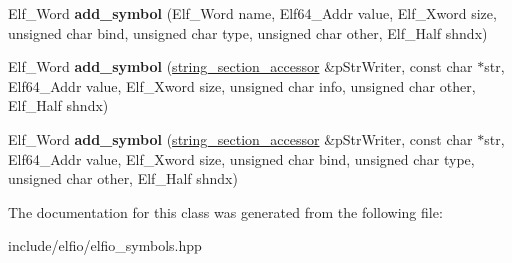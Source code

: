\begin{DoxyCompactItemize}
\item 
Elf\+\_\+\+Word {\bfseries add\+\_\+symbol} (Elf\+\_\+\+Word name, Elf64\+\_\+\+Addr value, Elf\+\_\+\+Xword size, unsigned char bind, unsigned char type, unsigned char other, Elf\+\_\+\+Half shndx)\hypertarget{class_e_l_f_i_o_1_1symbol__section__accessor_a0b20886a5e1dcb93534e813517d99f5b}{}\label{class_e_l_f_i_o_1_1symbol__section__accessor_a0b20886a5e1dcb93534e813517d99f5b}

\item 
Elf\+\_\+\+Word {\bfseries add\+\_\+symbol} (\hyperlink{class_e_l_f_i_o_1_1string__section__accessor}{string\+\_\+section\+\_\+accessor} \&p\+Str\+Writer, const char $\ast$str, Elf64\+\_\+\+Addr value, Elf\+\_\+\+Xword size, unsigned char info, unsigned char other, Elf\+\_\+\+Half shndx)\hypertarget{class_e_l_f_i_o_1_1symbol__section__accessor_ae68036ebd3d43a8d94aff3ce847c3123}{}\label{class_e_l_f_i_o_1_1symbol__section__accessor_ae68036ebd3d43a8d94aff3ce847c3123}

\item 
Elf\+\_\+\+Word {\bfseries add\+\_\+symbol} (\hyperlink{class_e_l_f_i_o_1_1string__section__accessor}{string\+\_\+section\+\_\+accessor} \&p\+Str\+Writer, const char $\ast$str, Elf64\+\_\+\+Addr value, Elf\+\_\+\+Xword size, unsigned char bind, unsigned char type, unsigned char other, Elf\+\_\+\+Half shndx)\hypertarget{class_e_l_f_i_o_1_1symbol__section__accessor_aa37baa8c08241f8240caf49035b1ac13}{}\label{class_e_l_f_i_o_1_1symbol__section__accessor_aa37baa8c08241f8240caf49035b1ac13}

\end{DoxyCompactItemize}


The documentation for this class was generated from the following file\+:\begin{DoxyCompactItemize}
\item 
include/elfio/elfio\+\_\+symbols.\+hpp\end{DoxyCompactItemize}
